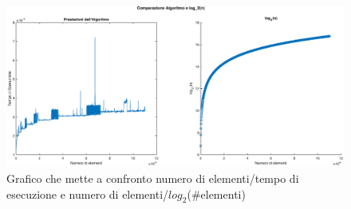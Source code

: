 \begin{figure}[H]
\vspace{-10pt}
    \includegraphics[width=\textwidth,height=\textheight,keepaspectratio]{./TeX_files/chart/comparison}
    \caption{Grafico che mette a confronto numero di elementi/tempo di esecuzione e  numero di elementi/$log_2$(\#elementi)}
\vspace{-10pt}
\end{figure}